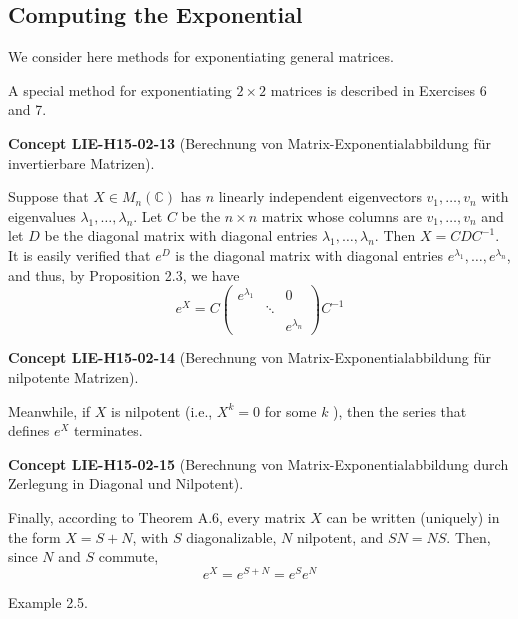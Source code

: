 \documentclass[10pt, letterpaper]{article}
\newcommand{\CustomHeading}[3]{%
  \par\medskip\noindent%
  \textbf{#1 #2} \textnormal{(#3)}.\enskip%
}
\newenvironment{CONC}[2]{\begin{unitbox}\CustomHeading{Concept}{#1}{#2}}{\end{unitbox}}
\begin{document}
\subsection*{Computing the Exponential}



We consider here methods for exponentiating general matrices. 

A special method for exponentiating $2 \times 2$ matrices is described in Exercises 6 and 7. 

\begin{CONC}{LIE-H15-02-13}{Berechnung von Matrix-Exponentialabbildung für invertierbare Matrizen}
Suppose that $X \in M_{n}(\mathbb{C})$ has $n$ linearly independent eigenvectors $v_{1}, \ldots, v_{n}$ with eigenvalues $\lambda_{1}, \ldots, \lambda_{n}$. Let $C$ be the $n \times n$ matrix whose columns are $v_{1}, \ldots, v_{n}$ and let $D$ be the diagonal matrix with diagonal entries $\lambda_{1}, \ldots, \lambda_{n}$. Then $X=C D C^{-1}$. It is easily verified that $e^{D}$ is the diagonal matrix with diagonal entries $e^{\lambda_{1}}, \ldots, e^{\lambda_{n}}$, and thus, by Proposition 2.3, we have
$$
e^{X}=C\left(\begin{array}{ccc}
e^{\lambda_{1}} & & 0 \\
& \ddots & \\
& & e^{\lambda_{n}}
\end{array}\right) C^{-1}
$$
\end{CONC}


\begin{CONC}{LIE-H15-02-14}{Berechnung von Matrix-Exponentialabbildung für nilpotente Matrizen}
Meanwhile, if $X$ is nilpotent (i.e., $X^{k}=0$ for some $k$ ), then the series that defines $e^{X}$ terminates.
\end{CONC}


\begin{CONC}{LIE-H15-02-15}{Berechnung von Matrix-Exponentialabbildung durch Zerlegung in Diagonal und Nilpotent}
Finally, according to Theorem A.6, every matrix $X$ can be written (uniquely) in the form $X=S+N$, with $S$ diagonalizable, $N$ nilpotent, and $S N=N S$. Then, since $N$ and $S$ commute,
$$
e^{X}=e^{S+N}=e^{S} e^{N}
$$
\end{CONC}

Example 2.5. 
\end{document}
